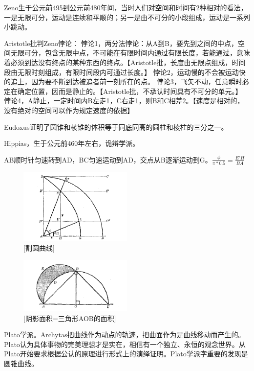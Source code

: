 \documentclass[UTF8]{../09-Mathematics}
\begin{document}
Zeno生于公元前495到公元前480年间，当时人们对空间和时间有2种相对的看法，一是无限可分，运动是连续和平顺的；另一是由不可分的小段组成，运动是一系列小跳动。

Aristotle批判Zeno悖论：
悖论1，两分法悖论：从A到B，要先到之间的中点，空间无限可分，包含无限中点，不可能在有限时间内通过有限长度，若能通过，意味着必须到达没有终点的某种东西的终点。【Aristotle批，长度由无限点组成，时间段由无限时刻组成，有限时间段内可通过长度。】
悖论2，运动慢的不会被运动快的追上，因为要不断到达被追者前一刻所在的点。
悖论3，飞矢不动，任意瞬时必定在确定位置，因而是静止的。【Aristotle批，不承认时间具有不可分的单元。】
悖论4，A静止，一定时间内B左走1，C右走1，则B和C相差2。【速度是相对的，没有绝对的空间可以作为规定速度的依据】

Eudoxus证明了圆锥和棱锥的体积等于同底同高的圆柱和棱柱的三分之一。

Hippias，生于公元前460年左右，诡辩学派。


AB顺时针匀速转到AD，BC匀速运动到AD，交点从B逐渐运动到G。$\frac{\phi}{\pi *0.5} = \frac{E'H}{BA}$
\begin{figure}[h]
    \centering
    \includegraphics[width=0.5\textwidth]{./resources/古今数学思想-图3_10.png}
    \caption{[割圆曲线]}
    \label{fig:3}
\end{figure}


\begin{figure}[h]
    \centering
    \includegraphics[width=0.5\textwidth]{./resources/古今数学思想-图3_11.png}
    \caption{[阴影面积=三角形AOB的面积]}
    \label{fig:4}
\end{figure}

Plato学派。Archytas把曲线作为动点的轨迹，把曲面作为是曲线移动而产生的。Plato认为具体事物的完美理想才是实在，相信有一个独立、永恒的观念世界。从Plato开始要求根据公认的原理进行形式上的演绎证明。Plato学派字重要的发现是圆锥曲线。
\end{document}
